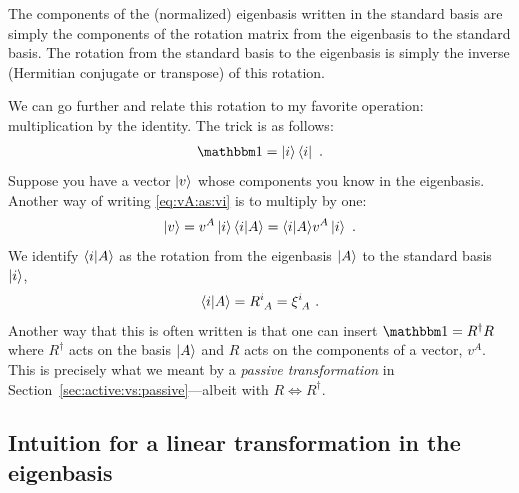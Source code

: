 \documentclass[12pt]{article}
\begin{document}
\begin{bigidea}
The components of the (normalized) eigenbasis written in the standard basis are simply the components of the rotation matrix from the eigenbasis to the standard basis. The rotation from the standard basis to the eigenbasis is simply the inverse (Hermitian conjugate or transpose) of this rotation. 
\end{bigidea}


We can go further and relate this rotation to my favorite operation: multiplication by the identity. The trick is as follows:
\begin{align}
    \one = \ket{i}\bra{i} \ .
\end{align}
Suppose you have a vector $\left|v\right\rangle$ whose components you know in the eigenbasis. Another way of writing \eqref{eq:vA:as:vi} is to multiply by one:
\begin{align}
    \left|v\right\rangle = v^A \left|i\right\rangle\langle i | A\rangle = \langle i | A\rangle v^A \left|i\right\rangle \ .
\end{align}
We identify $\langle i | A \rangle$ as the rotation from the eigenbasis $\left|A\right\rangle$ to the standard basis $\left|i\right\rangle$, 
\begin{align}
    \la i | A \ra = R\aij{i}{A} = \xi\aij{i}{A} \ .
\end{align}
Another way that this is often written is that one can insert $\one = R^\dag R$ where $R^\dag$ acts on the basis $\left|A\right\rangle$ and $R$ acts on the components of a vector, $v^A$. This is precisely what we meant by a \emph{passive transformation} in Section~\ref{sec:active:vs:passive}---albeit with $R\Leftrightarrow R^\dag$.




\subsection{Intuition for a linear transformation in the eigenbasis}
\end{document}
